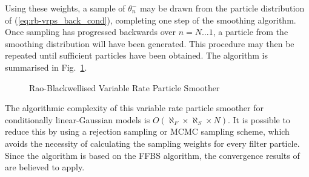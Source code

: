 \documentclass[peerreview,11pt,draftcls,onecolumn]{IEEEtran}
\begin{document}
Using these weights, a sample of $\theta_{n}^-$ may be drawn from the particle distribution of (\ref{eq:rb-vrps_back_cond}), completing one step of the smoothing algorithm. Once sampling has progressed backwards over $n=N \dots 1$, a particle from the smoothing distribution will have been generated. This procedure may then be repeated until sufficient particles have been obtained. The algorithm is summarised in Fig.~\ref{alg:RBVRPS}.

\begin{figure}
\caption{Rao-Blackwellised Variable Rate Particle Smoother}
\label{alg:RBVRPS}
\end{figure}

The algorithmic complexity of this variable rate particle smoother for conditionally linear-Gaussian models is $O(\aleph_F \times \aleph_S \times N)$. It is possible to reduce this by using a rejection sampling \cite{Douc2011} or MCMC \cite{Bunch2012} sampling scheme, which avoids the necessity of calculating the sampling weights for every filter particle. Since the algorithm is based on the FFBS algorithm, the convergence results of \cite{Godsill2004,Douc2011} are believed to apply.
\end{document}
